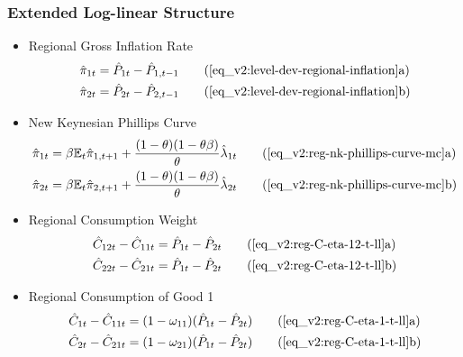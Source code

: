 \documentclass[../thesis.tex]{subfiles}
\begin{document}
{\singlespacing
	
\begin{comment}
	
\end{comment}

\subsubsection{Extended Log-linear Structure}
	
\begin{itemize}
	
	\item Regional Gross Inflation Rate
	\begin{align}
		\hat{\pi}_{1t} &= \hat{P}_{1t} - \hat{P}_{1, t-1} \tag{\ref{eq_v2:level-dev-regional-inflation}a} \\
		\hat{\pi}_{2t} &= \hat{P}_{2t} - \hat{P}_{2, t-1} \tag{\ref{eq_v2:level-dev-regional-inflation}b}
	\end{align}
	
	\item New Keynesian Phillips Curve
	\begin{align}
		\hat{\pi}_{1 t} &= \beta \E \hat{\pi}_{1, t+1} + \frac{(1-\theta) (1- \theta \beta)}{\theta} \hat{\lambda}_{1 t} \tag{\ref{eq_v2:reg-nk-phillips-curve-mc}a} \\
		\hat{\pi}_{2 t} &= \beta \E \hat{\pi}_{2, t+1} + \frac{(1-\theta) (1- \theta \beta)}{\theta} \hat{\lambda}_{2 t} \tag{\ref{eq_v2:reg-nk-phillips-curve-mc}b}
	\end{align}
	
	\item Regional Consumption Weight
	\begin{align}
		\hat{C}_{1 2t} - \hat{C}_{1 1t} &= \hat{P}_{1t} - \hat{P}_{2t} \tag{\ref{eq_v2:reg-C-eta-12-t-ll}a} \\
		\hat{C}_{2 2t} - \hat{C}_{2 1t} &= \hat{P}_{1t} - \hat{P}_{2t} \tag{\ref{eq_v2:reg-C-eta-12-t-ll}b}
	\end{align}
	
	\item Regional Consumption of Good 1
	\begin{align}
		\hat{C}_{1 t} - \hat{C}_{1 1 t} &= (1 - \omega_{1 1}) (\hat{P}_{1t} - \hat{P}_{2t}) \tag{\ref{eq_v2:reg-C-eta-1-t-ll}a} \\
		\hat{C}_{2 t} - \hat{C}_{2 1 t} &= (1 - \omega_{2 1}) (\hat{P}_{1t} - \hat{P}_{2t}) \tag{\ref{eq_v2:reg-C-eta-1-t-ll}b}
	\end{align}
	

\end{itemize}}
\end{document}
